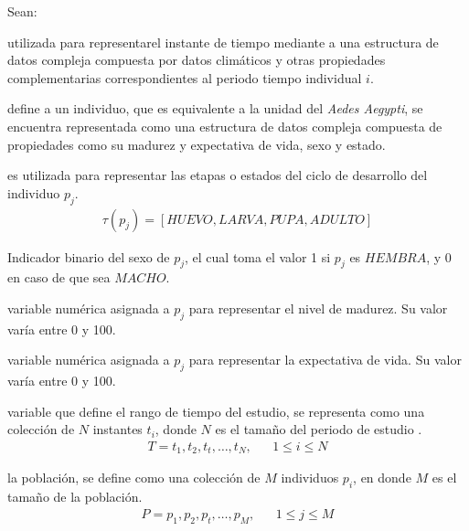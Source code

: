 Sean:
\begin{description}[style=multiline,leftmargin=1.5cm]
    \item[$t_{i}$] utilizada para representarel instante de tiempo mediante a una estructura de datos compleja
    compuesta por datos climáticos y otras propiedades complementarias correspondientes al periodo tiempo
    individual $i$.
    
    \item[$p_{i}$] define a un individuo, que es equivalente a la unidad del \textit{Aedes Aegypti}, se encuentra
    representada como una estructura de datos compleja compuesta de propiedades como su  madurez y expectativa de
    vida, sexo y estado.

    \item[$\tau(p_{j})$]  es utilizada para representar las etapas o estados del ciclo
    de desarrollo del individuo $p_{j}$.
    \begin{align*}
        \tau (p_{j}) = [HUEVO, LARVA, PUPA, ADULTO]
    \end{align*}

    \item[$S(p_{j})$]  Indicador binario del sexo de $p_{j}$, el cual toma el valor 1
    si $p_{j}$ es $HEMBRA$, y 0 en caso de que sea $MACHO$.

    \item[$\eta (p_{j})$]  variable numérica asignada a $p_{j}$ para representar el nivel
    de madurez. Su valor varía entre 0 y 100.
    
    \item[$\xi (p_{j})$]  variable numérica asignada a $p_{j}$ para representar la
    expectativa de vida. Su valor varía entre 0 y 100.
    
    \item[$T$] variable que define el rango de tiempo del estudio, se representa como una colección de $N$
    instantes $t_{i}$, donde $N$ es el tamaño del periodo de estudio .
        \begin{align*}
            T = t_1,t_2,t_t,\ldots,t_N , & & 1 \leq i \leq N
        \end{align*}

    \item[$P$] la población, se define como una colección de $M$ individuos $p_{i}$, en donde $M$ es el tamaño de
    la población.
    \begin{align*}
        P = p_1,p_2,p_t,\ldots,p_M,  & & 1 \leq j \leq M
    \end{align*}
    
\end{description}


